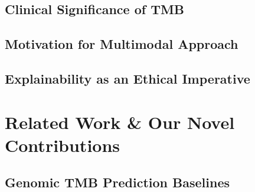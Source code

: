 \documentclass[11pt,a4paper]{article}
\begin{document}
\subsection{Clinical Significance of TMB}

\subsection{Motivation for Multimodal Approach}

\subsection{Explainability as an Ethical Imperative}

\section{Related Work \& Our Novel Contributions}
\label{sec:related_work}


\subsection{Genomic TMB Prediction Baselines}
\end{document}

